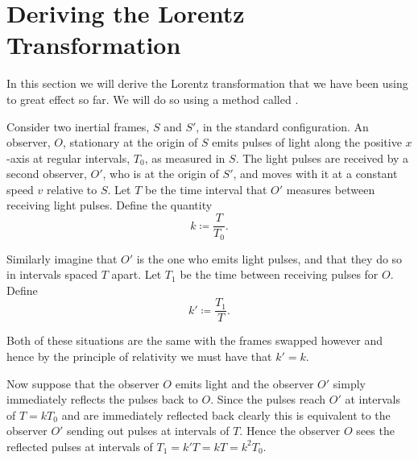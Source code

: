 \documentclass[fleqn]{NotesClass}
\begin{document}
    \section{Deriving the Lorentz Transformation}
    In this section we will derive the Lorentz transformation that we have been using to great effect so far.
    We will do so using a method called .
    
    Consider two inertial frames, \(S\) and \(S'\), in the standard configuration.
    An observer, \(O\), stationary at the origin of \(S\) emits pulses of light along the positive \(x\)-axis at regular intervals, \(T_0\), as measured in \(S\).
    The light pulses are received by a second observer, \(O'\), who is at the origin of \(S'\), and moves with it at a constant speed \(v\) relative to \(S\).
    Let \(T\) be the time interval that \(O'\) measures between receiving light pulses.
    Define the quantity 
    \begin{equation}
        k \coloneqq \frac{T}{T_0}.
    \end{equation}
    
    Similarly imagine that \(O'\) is the one who emits light pulses, and that they do so in intervals spaced \(T\) apart.
    Let \(T_1\) be the time between receiving pulses for \(O\).
    Define
    \begin{equation}
        k' \coloneqq \frac{T_1}{T}.
    \end{equation}
    
    Both of these situations are the same with the frames swapped however and hence by the principle of relativity we must have that \(k' = k\).
    
    Now suppose that the observer \(O\) emits light and the observer \(O'\) simply immediately reflects the pulses back to \(O\).
    Since the pulses reach \(O'\) at intervals of \(T = kT_0\) and are immediately reflected back clearly this is equivalent to the observer \(O'\) sending out pulses at intervals of \(T\).
    Hence the observer \(O\) sees the reflected pulses at intervals of \(T_1 = k'T = kT = k^2T_0\).
    
\end{document}
